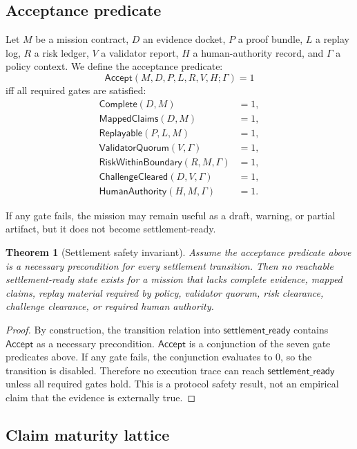 \documentclass[11pt]{article}
\newtheorem{theorem}{Theorem}[section]
\begin{document}
\subsection{Acceptance predicate}

Let $M$ be a mission contract, $D$ an evidence docket, $P$ a proof bundle, $L$ a replay log, $R$ a risk ledger, $V$ a validator report, $H$ a human-authority record, and $\Gamma$ a policy context. We define the acceptance predicate:
\[
\mathsf{Accept}(M,D,P,L,R,V,H;\Gamma)=1
\]
iff all required gates are satisfied:
\begin{align*}
\mathsf{Complete}(D,M)&=1,\\
\mathsf{MappedClaims}(D,M)&=1,\\
\mathsf{Replayable}(P,L,M)&=1,\\
\mathsf{ValidatorQuorum}(V,\Gamma)&=1,\\
\mathsf{RiskWithinBoundary}(R,M,\Gamma)&=1,\\
\mathsf{ChallengeCleared}(D,V,\Gamma)&=1,\\
\mathsf{HumanAuthority}(H,M,\Gamma)&=1.
\end{align*}

If any gate fails, the mission may remain useful as a draft, warning, or partial artifact, but it does not become settlement-ready.

\begin{theorem}[Settlement safety invariant]
Assume the acceptance predicate above is a necessary precondition for every settlement transition. Then no reachable settlement-ready state exists for a mission that lacks complete evidence, mapped claims, replay material required by policy, validator quorum, risk clearance, challenge clearance, or required human authority.
\end{theorem}

\begin{proof}
By construction, the transition relation into $\textsf{settlement\_ready}$ contains $\mathsf{Accept}$ as a necessary precondition. $\mathsf{Accept}$ is a conjunction of the seven gate predicates above. If any gate fails, the conjunction evaluates to $0$, so the transition is disabled. Therefore no execution trace can reach $\textsf{settlement\_ready}$ unless all required gates hold. This is a protocol safety result, not an empirical claim that the evidence is externally true.
\end{proof}

\subsection{Claim maturity lattice}
\end{document}
